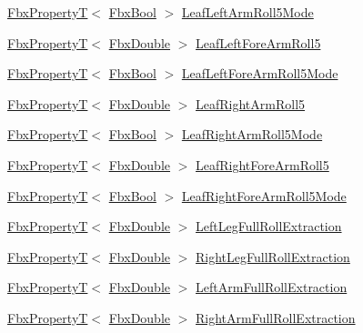 \begin{DoxyCompactItemize}
\item 
\hyperlink{class_fbx_property_t}{Fbx\+PropertyT}$<$ \hyperlink{fbxtypes_8h_a92e0562b2fe33e76a242f498b362262e}{Fbx\+Bool} $>$ \hyperlink{class_fbx_character_a79498d23bc3a1780dd984e6e5b788b99}{Leaf\+Left\+Arm\+Roll5\+Mode}
\item 
\hyperlink{class_fbx_property_t}{Fbx\+PropertyT}$<$ \hyperlink{fbxtypes_8h_a171e72a1c46fc15c1a6c9c31948c1c5b}{Fbx\+Double} $>$ \hyperlink{class_fbx_character_aeff67c8d51b8ae048237639dda9bbba1}{Leaf\+Left\+Fore\+Arm\+Roll5}
\item 
\hyperlink{class_fbx_property_t}{Fbx\+PropertyT}$<$ \hyperlink{fbxtypes_8h_a92e0562b2fe33e76a242f498b362262e}{Fbx\+Bool} $>$ \hyperlink{class_fbx_character_a56d039ed5967f3dc586655aeed17f7de}{Leaf\+Left\+Fore\+Arm\+Roll5\+Mode}
\item 
\hyperlink{class_fbx_property_t}{Fbx\+PropertyT}$<$ \hyperlink{fbxtypes_8h_a171e72a1c46fc15c1a6c9c31948c1c5b}{Fbx\+Double} $>$ \hyperlink{class_fbx_character_a31a5a731e57e9495d2c3e3463cb81328}{Leaf\+Right\+Arm\+Roll5}
\item 
\hyperlink{class_fbx_property_t}{Fbx\+PropertyT}$<$ \hyperlink{fbxtypes_8h_a92e0562b2fe33e76a242f498b362262e}{Fbx\+Bool} $>$ \hyperlink{class_fbx_character_a49c22d541bd008482ad38478ddb7c611}{Leaf\+Right\+Arm\+Roll5\+Mode}
\item 
\hyperlink{class_fbx_property_t}{Fbx\+PropertyT}$<$ \hyperlink{fbxtypes_8h_a171e72a1c46fc15c1a6c9c31948c1c5b}{Fbx\+Double} $>$ \hyperlink{class_fbx_character_afa3c3fcb690fce868b1b6b77f9be9ca3}{Leaf\+Right\+Fore\+Arm\+Roll5}
\item 
\hyperlink{class_fbx_property_t}{Fbx\+PropertyT}$<$ \hyperlink{fbxtypes_8h_a92e0562b2fe33e76a242f498b362262e}{Fbx\+Bool} $>$ \hyperlink{class_fbx_character_a00d5ad06ba8a7e85f18ff4907b924eb5}{Leaf\+Right\+Fore\+Arm\+Roll5\+Mode}
\item 
\hyperlink{class_fbx_property_t}{Fbx\+PropertyT}$<$ \hyperlink{fbxtypes_8h_a171e72a1c46fc15c1a6c9c31948c1c5b}{Fbx\+Double} $>$ \hyperlink{class_fbx_character_aec7cb86bbe26ae7eed3e7e26f026221a}{Left\+Leg\+Full\+Roll\+Extraction}
\item 
\hyperlink{class_fbx_property_t}{Fbx\+PropertyT}$<$ \hyperlink{fbxtypes_8h_a171e72a1c46fc15c1a6c9c31948c1c5b}{Fbx\+Double} $>$ \hyperlink{class_fbx_character_aefa979f235675c3dff6d25d2d32716e5}{Right\+Leg\+Full\+Roll\+Extraction}
\item 
\hyperlink{class_fbx_property_t}{Fbx\+PropertyT}$<$ \hyperlink{fbxtypes_8h_a171e72a1c46fc15c1a6c9c31948c1c5b}{Fbx\+Double} $>$ \hyperlink{class_fbx_character_ad569d30e14b20028b2b34c4e8b3a3374}{Left\+Arm\+Full\+Roll\+Extraction}
\item 
\hyperlink{class_fbx_property_t}{Fbx\+PropertyT}$<$ \hyperlink{fbxtypes_8h_a171e72a1c46fc15c1a6c9c31948c1c5b}{Fbx\+Double} $>$ \hyperlink{class_fbx_character_aa3de38aa03e69e153cad072cf63eb299}{Right\+Arm\+Full\+Roll\+Extraction}
\end{DoxyCompactItemize}
